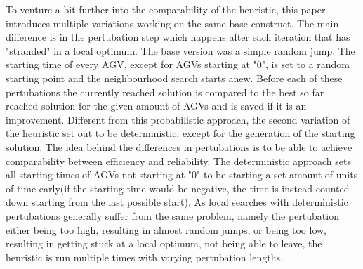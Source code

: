 To venture a bit further into the comparability of the heuristic, this paper introduces multiple variations working on the same base construct.
The main difference is in the pertubation step which happens after each iteration that has "stranded" in a local optimum. The base version was
a simple random jump. The starting time of every AGV, except for AGVs starting at "0", is set to a random starting point and the neighbourhood
search starts anew. Before each of these pertubations the currently reached solution is compared to the best so far reached solution for the given
amount of AGVs and is saved if it is an improvement. Different from this probabilistic approach, the second variation of the heuristic set out to
be deterministic, except for the generation of the starting solution. The idea behind the differences in pertubations is to be able to achieve
comparability between efficiency and reliability. The deterministic approach sets all starting times of AGVs not starting at "0" to be starting
a set amount of units of time early(if the starting time would be negative, the time is instead counted down starting from the last possible start).
As local searches with deterministic pertubations generally suffer from the same problem, namely the pertubation either being too high, resulting
in almost random jumps, or being too low, resulting in getting stuck at a local optimum, not being able to leave, the heuristic is run multiple
times with varying pertubation lengths.